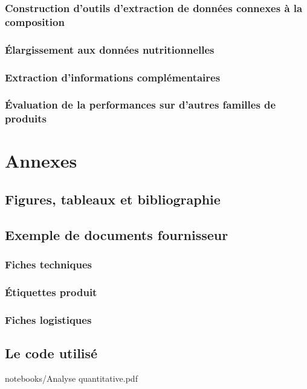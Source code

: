 \documentclass{report}
\begin{document}
        \section{Construction d'outils d'extraction de données connexes à la composition}
        \section{\'{E}largissement aux données nutritionnelles}
        \section{Extraction d'informations complémentaires}
        \section{\'{E}valuation de la performances sur d'autres familles de produits}


\appendix
\part{Annexes}
    \chapter{Figures, tableaux et bibliographie}
        \listoftables
        \listoffigures
        
         
    \chapter{Exemple de documents fournisseur}
        \section{Fiches techniques}
        \section{\'{E}tiquettes produit}
        \section{Fiches logistiques}
    \chapter{Le code utilisé}
        
                    {notebooks/Analyse quantitative.pdf}
\end{document}

